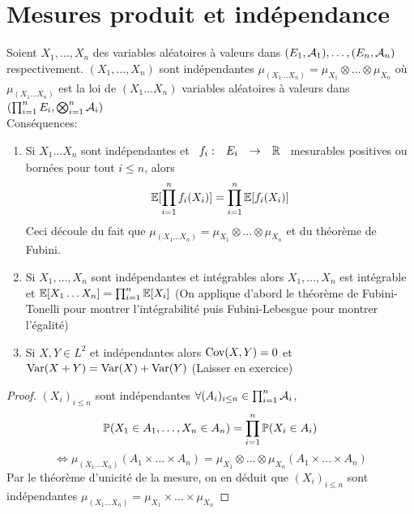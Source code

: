 \documentclass[]{report}
\begin{document}
    \section{Mesures produit et indépendance}

    \begin{prop}{}{}
        Soient $X_1,\ldots,X_n$ des variables aléatoires à valeurs dans $(E_1,\mathcal{A}_1),\ldots,(E_n,\mathcal{A}_n)$ respectivement. $(X_1,\ldots, X_n)$ sont indépendantes \ssi $\mu_{(X_1\ldots X_n)}=\mu_{X_1}\otimes\ldots\otimes \mu_{X_n}$ où $\mu_{(X_1\ldots X_n)}$ est la loi de $(X_1\ldots X_n)$ variables aléatoires à valeurs dans $(\prod_{i=1}^{n}E_i,\bigotimes_{i=1}^n \mathcal{A}_i)$\\
        Conséquences: 
        \begin{enumerate}
            \item Si $X_1\ldots X_n$ sont indépendantes et $\begin{array}{ccccc} f_i : & E_i & \to & \mathbb{R} \end{array}$ mesurables positives ou bornées pour tout $i\le n$, alors
            \[\mathbb{E}[\prod_{i=1}^{n}f_i(X_i)]=\prod_{i=1}^{n}\mathbb{E}[f_i(X_i)]\]
            Ceci découle du fait que $\mu_{(X_1\ldots X_n)}=\mu_{X_1}\otimes \ldots \otimes \mu_{X_n}$ et du théorème de Fubini.
            \item Si $X_1,\ldots,X_n$ sont indépendantes et intégrables alors $X_1,\ldots,X_n$ est intégrable et $\mathbb{E}[X_1\ldots X_n]=\prod_{i=1}^{n}\mathbb{E}[X_i]$
            (On applique d'abord le théorème de Fubini-Tonelli pour montrer l'intégrabilité puis Fubini-Lebesgue pour montrer l'égalité)
            \item Si $X,Y\in L^2$ et indépendantes alors $\text{Cov}(X,Y)=0$ et $\text{Var}(X+Y)=\text{Var}(X)+\text{Var}(Y)$ (Laisser en exercice)
        \end{enumerate}
    \end{prop}

    
    \begin{proof}
        $(X_i)_{i\le n}$ sont indépendantes \ssi $\forall (A_i)_{i\le n}\in \prod_{i=1}^{n}\mathcal{A}_i$,
        \[\mathbb{P}(X_1\in A_1,\ldots,X_n\in A_n)=\prod_{i=1}^{n}\mathbb{P}(X_i\in A_i)\]
        \[\iff \mu_{(X_1\ldots X_n)}(A_1\times\ldots \times A_n)=\mu_{X_1}\otimes\ldots\otimes \mu_{X_n}(A_1\times\ldots\times A_n)\]
        Par le théorème d'unicité de la mesure, on en déduit que $(X_i)_{i\le n}$ sont indépendantes \ssi $\mu_{(X_1\ldots X_n)}=\mu_{X_1}\times\ldots\times \mu_{X_n}$
    \end{proof}
\end{document}
